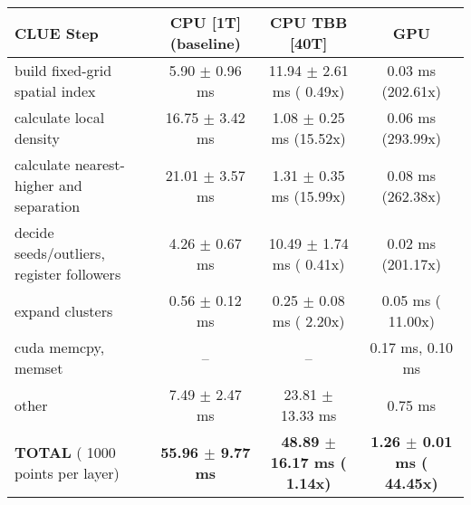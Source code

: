     \begin{tabular}{l|c|c|c}
    \hline
    CLUE Step                                 & CPU [1T] (baseline)         & CPU TBB [40T]                         & GPU                       \\ \hline
    build fixed-grid spatial index            &   5.90 $\pm$  0.96 ms       &  11.94 $\pm$  2.61 ms ( 0.49x)        &   0.03 ms (202.61x)       \\
    calculate local density                   &  16.75 $\pm$  3.42 ms       &   1.08 $\pm$  0.25 ms (15.52x)        &   0.06 ms (293.99x)       \\
    calculate nearest-higher and separation   &  21.01 $\pm$  3.57 ms       &   1.31 $\pm$  0.35 ms (15.99x)        &   0.08 ms (262.38x)       \\
    decide seeds/outliers, register followers &   4.26 $\pm$  0.67 ms       &  10.49 $\pm$  1.74 ms ( 0.41x)        &   0.02 ms (201.17x)       \\
    expand clusters                           &   0.56 $\pm$  0.12 ms       &   0.25 $\pm$  0.08 ms ( 2.20x)        &   0.05 ms ( 11.00x)       \\ \hline
    cuda memcpy, memset                       & --                          & --                                    &   0.17 ms,   0.10 ms      \\ 
    other                                     &   7.49 $\pm$  2.47 ms       &  23.81 $\pm$ 13.33 ms                 &   0.75 ms                 \\ \hline
    \textbf{TOTAL} ( 1000 points per layer)   & \textbf{ 55.96 $\pm$  9.77 ms} & \textbf{ 48.89 $\pm$ 16.17 ms ( 1.14x)} & \textbf{  1.26 $\pm$  0.01 ms ( 44.45x)}  \\
    \hline 
    \end{tabular}
    \linebreak


